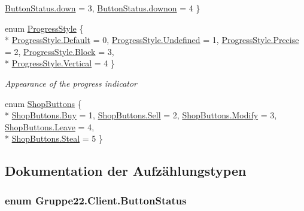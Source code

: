 \begin{DoxyCompactItemize}
\hyperlink{namespace_gruppe22_1_1_client_ab04cc66caef13cf24be10621da9097e2a74e8333ad11685ff3bdae589c8f6e34d}{Button\-Status.\-down} = 3, 
\hyperlink{namespace_gruppe22_1_1_client_ab04cc66caef13cf24be10621da9097e2a1a6deec28be6f4c67b6bb0a3baa60c25}{Button\-Status.\-downon} = 4
 \}
\item 
enum \hyperlink{namespace_gruppe22_1_1_client_a4f652636831acdc7988060a3c213d941}{Progress\-Style} \{ \\*
\hyperlink{namespace_gruppe22_1_1_client_a4f652636831acdc7988060a3c213d941a7a1920d61156abc05a60135aefe8bc67}{Progress\-Style.\-Default} = 0, 
\hyperlink{namespace_gruppe22_1_1_client_a4f652636831acdc7988060a3c213d941aec0fc0100c4fc1ce4eea230c3dc10360}{Progress\-Style.\-Undefined} = 1, 
\hyperlink{namespace_gruppe22_1_1_client_a4f652636831acdc7988060a3c213d941aa15adae4bec50f3317d666972d3b9aeb}{Progress\-Style.\-Precise} = 2, 
\hyperlink{namespace_gruppe22_1_1_client_a4f652636831acdc7988060a3c213d941ae1e4c8c9ccd9fc39c391da4bcd093fb2}{Progress\-Style.\-Block} = 3, 
\\*
\hyperlink{namespace_gruppe22_1_1_client_a4f652636831acdc7988060a3c213d941a06ce2a25e5d12c166a36f654dbea6012}{Progress\-Style.\-Vertical} = 4
 \}
\begin{DoxyCompactList}\small\item\em Appearance of the progress indicator \end{DoxyCompactList}\item 
enum \hyperlink{namespace_gruppe22_1_1_client_aa77a047521f040f259d376e46b648666}{Shop\-Buttons} \{ \\*
\hyperlink{namespace_gruppe22_1_1_client_aa77a047521f040f259d376e46b648666a831a28f1e8df07c553fcd59546465d13}{Shop\-Buttons.\-Buy} = 1, 
\hyperlink{namespace_gruppe22_1_1_client_aa77a047521f040f259d376e46b648666a3068c5a98c003498f1fec0c489212e8b}{Shop\-Buttons.\-Sell} = 2, 
\hyperlink{namespace_gruppe22_1_1_client_aa77a047521f040f259d376e46b648666a7f090bbab1cc7f9c08bf4e54d932d3c0}{Shop\-Buttons.\-Modify} = 3, 
\hyperlink{namespace_gruppe22_1_1_client_aa77a047521f040f259d376e46b648666aa52945dbe283de2f7e9d63ca3417f36a}{Shop\-Buttons.\-Leave} = 4, 
\\*
\hyperlink{namespace_gruppe22_1_1_client_aa77a047521f040f259d376e46b648666adf2da70719acb96b4702c5abf1ffc993}{Shop\-Buttons.\-Steal} = 5
 \}
\end{DoxyCompactItemize}


\subsection{Dokumentation der Aufzählungstypen}
\hypertarget{namespace_gruppe22_1_1_client_ab04cc66caef13cf24be10621da9097e2}{
\subsubsection[{Button\-Status}]{\setlength{\rightskip}{0pt plus 5cm}enum {\bf Gruppe22.\-Client.\-Button\-Status}}}\label{namespace_gruppe22_1_1_client_ab04cc66caef13cf24be10621da9097e2}




